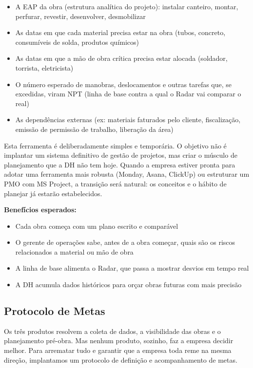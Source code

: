 \documentclass[12pt,a4paper]{scrartcl}
\begin{document}
\begin{itemize}
  \item A EAP da obra (estrutura analítica do projeto): instalar canteiro, montar, perfurar, revestir, desenvolver, desmobilizar
  \item As datas em que cada material precisa estar na obra (tubos, concreto, consumíveis de solda, produtos químicos)
  \item As datas em que a mão de obra crítica precisa estar alocada (soldador, torrista, eletricista)
  \item O número esperado de manobras, deslocamentos e outras tarefas que, se excedidas, viram NPT (linha de base contra a qual o Radar vai comparar o real)
  \item As dependências externas (ex: materiais faturados pelo cliente, fiscalização, emissão de permissão de trabalho, liberação da área)
\end{itemize}

Esta ferramenta é deliberadamente simples e temporária. O objetivo não é implantar um sistema definitivo de gestão de projetos, mas criar o músculo de planejamento que a DH não tem hoje. Quando a empresa estiver pronta para adotar uma ferramenta mais robusta (Monday, Asana, ClickUp) ou estruturar um PMO com MS Project, a transição será natural: os conceitos e o hábito de planejar já estarão estabelecidos.

\textbf{Benefícios esperados:}
\begin{itemize}
  \item Cada obra começa com um plano escrito e comparável
  \item O gerente de operações sabe, antes de a obra começar, quais são os riscos relacionados a material ou mão de obra
  \item A linha de base alimenta o Radar, que passa a mostrar desvios em tempo real
  \item A DH acumula dados históricos para orçar obras futuras com mais precisão
\end{itemize}

\subsection{Protocolo de Metas}

Os três produtos resolvem a coleta de dados, a visibilidade das obras e o planejamento pré-obra. Mas nenhum produto, sozinho, faz a empresa decidir melhor. Para arrematar tudo e garantir que a empresa toda reme na mesma direção, implantamos um protocolo de definição e acompanhamento de metas.
\end{document}
